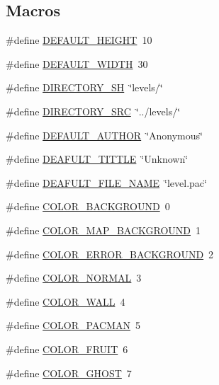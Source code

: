 \subsection*{Macros}
\begin{DoxyCompactItemize}
\item 
\#define \hyperlink{pacman-level-editor_8c_a1879f9e5604a01f0983829846001ab23}{D\-E\-F\-A\-U\-L\-T\-\_\-\-H\-E\-I\-G\-H\-T}~10
\item 
\#define \hyperlink{pacman-level-editor_8c_a93493eb8fae5549bd5be67f3449245e0}{D\-E\-F\-A\-U\-L\-T\-\_\-\-W\-I\-D\-T\-H}~30
\item 
\#define \hyperlink{pacman-level-editor_8c_a7a602a4376595097bdde82a739d7fc9c}{D\-I\-R\-E\-C\-T\-O\-R\-Y\-\_\-\-S\-H}~\char`\"{}levels/\char`\"{}
\item 
\#define \hyperlink{pacman-level-editor_8c_a680ab63d028a68a793615c14b807244e}{D\-I\-R\-E\-C\-T\-O\-R\-Y\-\_\-\-S\-R\-C}~\char`\"{}../levels/\char`\"{}
\item 
\#define \hyperlink{pacman-level-editor_8c_a0df6a4797ddf20bd10851daf8ba3e223}{D\-E\-F\-A\-U\-L\-T\-\_\-\-A\-U\-T\-H\-O\-R}~\char`\"{}Anonymous\char`\"{}
\item 
\#define \hyperlink{pacman-level-editor_8c_a4b3befe82323eb5de5dc65ccf44283ea}{D\-E\-A\-F\-U\-L\-T\-\_\-\-T\-I\-T\-T\-L\-E}~\char`\"{}Unknown\char`\"{}
\item 
\#define \hyperlink{pacman-level-editor_8c_afd9e8106b9402bf121477c457c8c9316}{D\-E\-A\-F\-U\-L\-T\-\_\-\-F\-I\-L\-E\-\_\-\-N\-A\-M\-E}~\char`\"{}level.\-pac\char`\"{}
\item 
\#define \hyperlink{pacman-level-editor_8c_af27cfac70191e90ee59f2fbfc0142df5}{C\-O\-L\-O\-R\-\_\-\-B\-A\-C\-K\-G\-R\-O\-U\-N\-D}~0
\item 
\#define \hyperlink{pacman-level-editor_8c_aa0c3931283632f3b28ad3ab6fe6d7ffb}{C\-O\-L\-O\-R\-\_\-\-M\-A\-P\-\_\-\-B\-A\-C\-K\-G\-R\-O\-U\-N\-D}~1
\item 
\#define \hyperlink{pacman-level-editor_8c_a74d87509e98e202c778b5a9e4ae89f09}{C\-O\-L\-O\-R\-\_\-\-E\-R\-R\-O\-R\-\_\-\-B\-A\-C\-K\-G\-R\-O\-U\-N\-D}~2
\item 
\#define \hyperlink{pacman-level-editor_8c_ac366dc6682d1d12bcae1eb1ae8ae09c5}{C\-O\-L\-O\-R\-\_\-\-N\-O\-R\-M\-A\-L}~3
\item 
\#define \hyperlink{pacman-level-editor_8c_a528521b4019fe0dbc561165851660df5}{C\-O\-L\-O\-R\-\_\-\-W\-A\-L\-L}~4
\item 
\#define \hyperlink{pacman-level-editor_8c_a977b7c2763deb11541bc962426297045}{C\-O\-L\-O\-R\-\_\-\-P\-A\-C\-M\-A\-N}~5
\item 
\#define \hyperlink{pacman-level-editor_8c_aa621edd711419dc69326010aabdb01bb}{C\-O\-L\-O\-R\-\_\-\-F\-R\-U\-I\-T}~6
\item 
\#define \hyperlink{pacman-level-editor_8c_a4dff2b6100530a45e7c3b38c9484f454}{C\-O\-L\-O\-R\-\_\-\-G\-H\-O\-S\-T}~7
\end{DoxyCompactItemize}
